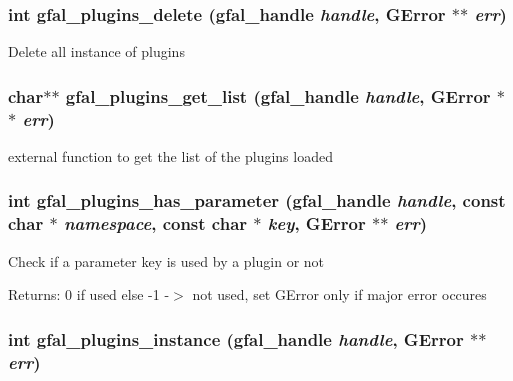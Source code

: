 \subsubsection{\setlength{\rightskip}{0pt plus 5cm}int gfal\_\-plugins\_\-delete (gfal\_\-handle {\em handle}, GError $\ast$$\ast$ {\em err})}\label{gfal__common__plugin_8c_3a5fd910584fad43a1a67c0e844ce528}


Delete all instance of plugins 
\subsubsection{\setlength{\rightskip}{0pt plus 5cm}char$\ast$$\ast$ gfal\_\-plugins\_\-get\_\-list (gfal\_\-handle {\em handle}, GError $\ast$$\ast$ {\em err})}\label{gfal__common__plugin_8c_59f53151c28e45f965a554a2a6806ad6}


external function to get the list of the plugins loaded 
\subsubsection{\setlength{\rightskip}{0pt plus 5cm}int gfal\_\-plugins\_\-has\_\-parameter (gfal\_\-handle {\em handle}, const char $\ast$ {\em namespace}, const char $\ast$ {\em key}, GError $\ast$$\ast$ {\em err})}\label{gfal__common__plugin_8c_5aa3f5f9b4e732b1841c6b367a0aa4fe}


Check if a parameter key is used by a plugin or not \begin{Desc}
\item[Returns:]0 if used else -1 -$>$ not used, set GError only if major error occures \end{Desc}
\subsubsection{\setlength{\rightskip}{0pt plus 5cm}int gfal\_\-plugins\_\-instance (gfal\_\-handle {\em handle}, GError $\ast$$\ast$ {\em err})\hspace{0.3cm}{\tt  [inline]}}\label{gfal__common__plugin_8c_4d38083d4b9f51095013c0f3d233c0da}


